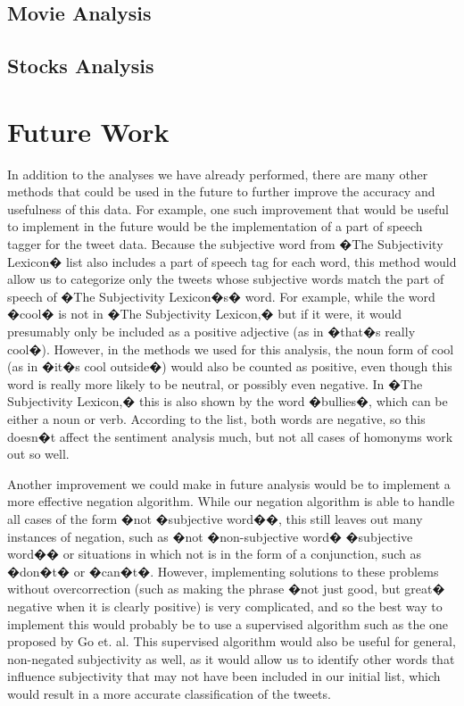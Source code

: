 \documentclass[11pt]{article}
\begin{document}
\subsection{Movie Analysis}

\subsection{Stocks Analysis}


\section{Future Work}
In addition to the analyses we have already performed, there are many other methods that could be used in the future to further improve the accuracy and usefulness of this data.  For example, one such improvement that would be useful to implement in the future would be the implementation of a part of speech tagger for the tweet data.  Because the subjective word from �The Subjectivity Lexicon� list also includes a part of speech tag for each word, this method would allow us to categorize only the tweets whose subjective words match the part of speech of �The Subjectivity Lexicon�s� word.  For example, while the word �cool� is not in �The Subjectivity Lexicon,� but if it were, it would presumably only be included as a positive adjective (as in �that�s really cool�).  However, in the methods we used for this analysis, the noun form of cool (as in �it�s cool outside�) would also be counted as positive, even though this word is really more likely to be neutral, or possibly even negative.  In �The Subjectivity Lexicon,� this is also shown by the word �bullies�, which can be either a noun or verb.  According to the list, both words are negative, so this doesn�t affect the sentiment analysis much, but not all cases of homonyms work out so well.

Another improvement we could make in future analysis would be to implement a more effective negation algorithm.  While our negation algorithm is able to handle all cases of the form �not �subjective word��, this still leaves out many instances of negation, such as �not �non-subjective word� �subjective word�� or situations in which not is in the form of a conjunction, such as �don�t� or �can�t�.  However, implementing solutions to these problems without overcorrection (such as making the phrase �not just good, but great� negative when it is clearly positive) is very complicated, and so the best way to implement this would probably be to use a supervised algorithm such as the one proposed by Go et. al.   This supervised algorithm would also be useful for general, non-negated subjectivity as well, as it would allow us to identify other words that influence subjectivity that may not have been included in our initial list, which would result in a more accurate classification of the tweets.
\end{document}
